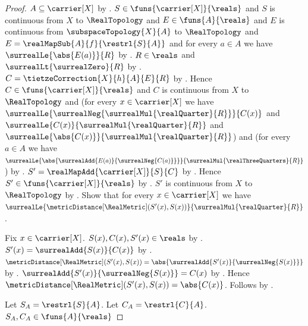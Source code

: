 \begin{proof}
    $A\subseteq\carrier[X]$ by .
    $S\in\funs{\carrier[X]}{\reals}$ and
        $S$ is continuous from $X$ to $\RealTopology$ and
        $E\in\funs{A}{\reals}$ and
        $E$ is continuous from $\subspaceTopology{X}{A}$ to
            $\RealTopology$ and
        $E=\realMapSub{A}{f}{\restrl{S}{A}}$ and
        for every $a\in A$ we have $\surrealLe{\abs{E(a)}}{R}$
        by .
    $R\in\reals$ and $\surrealLt{\surrealZero}{R}$
        by .
    $C=\tietzeCorrection{X}{h}{A}{E}{R}$
        by .
    Hence $C\in\funs{\carrier[X]}{\reals}$ and
        $C$ is continuous from $X$ to $\RealTopology$ and
        (for every $x\in\carrier[X]$ we have
            $\surrealLe{\surrealNeg{\surrealMul{\realQuarter}{R}}}
                {C(x)}$ and
            $\surrealLe{C(x)}{\surrealMul{\realQuarter}{R}}$ and
            $\surrealLe{\abs{C(x)}}
                {\surrealMul{\realQuarter}{R}}$) and
        (for every $a\in A$ we have
            $\surrealLe{\abs{\surrealAdd{E(a)}{\surrealNeg{C(a)}}}}
                {\surrealMul{\realThreeQuarters}{R}}$)
        by .
    $S'=\realMapAdd{\carrier[X]}{S}{C}$
        by .
    Hence $S'\in\funs{\carrier[X]}{\reals}$
        by .
    $S'$ is continuous from $X$ to $\RealTopology$
        by .
    Show that for every $x\in\carrier[X]$ we have
        $\surrealLe{\metricDistance[\RealMetric](S'(x),S(x))}
            {\surrealMul{\realQuarter}{R}}$.
    \begin{subproof}
        Fix $x\in\carrier[X]$.
        $S(x),C(x),S'(x)\in\reals$ by .
        $S'(x)=\surrealAdd{S(x)}{C(x)}$
            by .
        $\metricDistance[\RealMetric](S'(x),S(x))
            =\abs{\surrealAdd{S'(x)}{\surrealNeg{S(x)}}}$
            by .
        $\surrealAdd{S'(x)}{\surrealNeg{S(x)}}=C(x)$
            by
            .
        Hence $\metricDistance[\RealMetric](S'(x),S(x))=\abs{C(x)}$.
        Follows by \auto.
    \end{subproof}
    Let $S_A=\restrl{S}{A}$.
    Let $C_A=\restrl{C}{A}$.
    $S_A,C_A\in\funs{A}{\reals}$

\end{proof}
